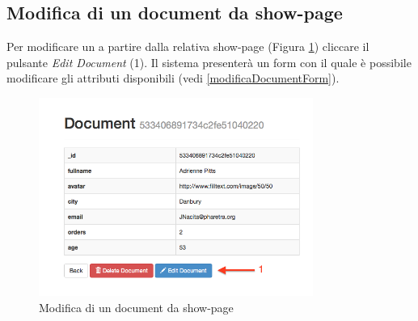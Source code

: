 \begin{enumerate}
		\end{enumerate}

	\clearpage
	\subsection{Modifica di un document da show-page} %
	\label{modificadocumentdashowpage}

			Per modificare un  a partire dalla relativa show-page (Figura \ref{fig:modificadocumentdashowpage}) cliccare il pulsante \emph{Edit Document} (1). Il sistema presenterà un form con il quale è possibile modificare gli attributi disponibili (vedi \ref{modificaDocumentForm}).

				\begin{figure}[H]
					\centering \includegraphics[width=0.8\textwidth]{img/modificadocumentdashowpage.png}
				\caption{\label{fig:modificadocumentdashowpage} Modifica di un document da show-page}
				\end{figure}
	
	\clearpage
